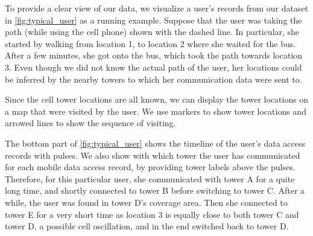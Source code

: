 To provide a clear view of our data, we visualize a user's records from our dataset in \autoref{fig:typical_user} as a running example.
Suppose that the user was taking the path (while using the cell phone) shown with the dashed line.
In particular, she started by walking from location 1, to location 2 where she waited for the bus.
After a few minutes, she got onto the bus, which took the path towards location 3.
Even though we did not know the actual path of the user,
her locations could be inferred by the nearby towers to which her communication data were sent to.

Since the cell tower locations are all known,
we can display the tower locations on a map that were visited by the user.
We use markers to show tower locations and arrowed lines to show the sequence of visiting.

The bottom part of \autoref{fig:typical_user} shows the timeline of the user's data access records with pulses.
We also show with which tower the user has communicated for each mobile data access record, by providing tower labels above the pulses.
Therefore, for this particular user, she communicated with tower A for a quite long time,
and shortly connected to tower B before switching to tower C.
After a while, the user was found in tower D's coverage area.
Then she connected to tower E for a very short time as location 3 is equally close to both tower C and tower D, \ie a possible cell oscillation, and in the end switched back to tower D.



